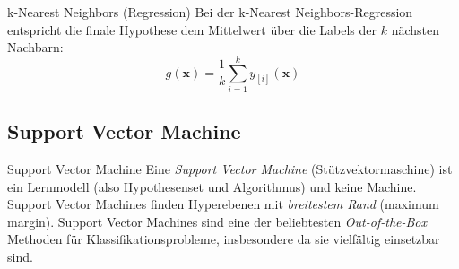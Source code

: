 \begin{defi}{k-Nearest Neighbors (Regression)}
    Bei der k-Nearest Neighbors-Regression entspricht die finale Hypothese dem Mittelwert über die Labels der $k$ nächsten Nachbarn:
    \[
        g(\mathbf{x}) = \frac{1}{k} \sum_{i=1}^k y_{[i]}(\mathbf{x})
    \]
\end{defi}

\subsection{Support Vector Machine}

\begin{defi}{Support Vector Machine}
    Eine \emph{Support Vector Machine} (Stützvektormaschine) ist ein Lernmodell (also Hypothesenset und Algorithmus) und keine Machine.
    Support Vector Machines finden Hyperebenen mit \emph{breitestem Rand} (maximum margin).
    Support Vector Machines sind eine der beliebtesten \emph{Out-of-the-Box} Methoden für Klassifikationsprobleme, insbesondere da sie vielfältig einsetzbar sind.
\end{defi}

